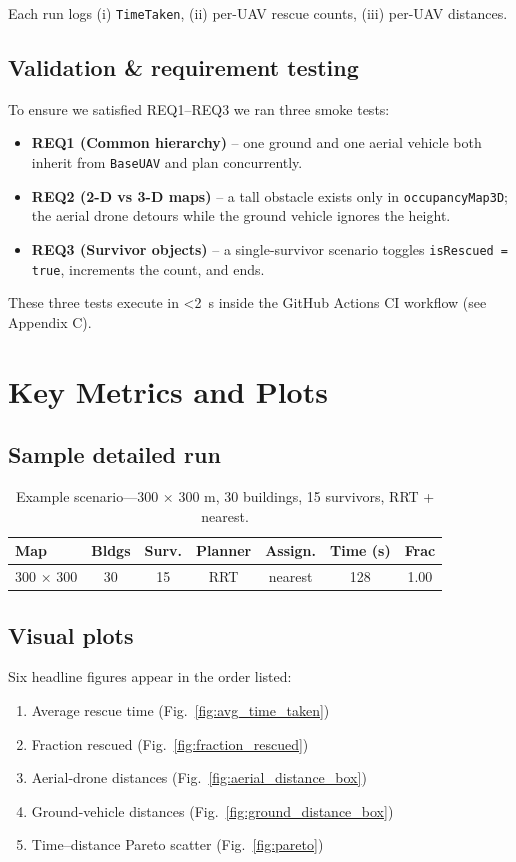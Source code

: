 \documentclass[12pt,a4paper]{report}
\begin{document}
Each run logs  
(i) \texttt{TimeTaken},  
(ii) per-UAV rescue counts,  
(iii) per-UAV distances.

\subsection*{Validation \& requirement testing}
To ensure we satisfied REQ1–REQ3 we ran three smoke tests:
\begin{itemize}
  \item \textbf{REQ1 (Common hierarchy)} – one ground and one aerial
        vehicle both inherit from \texttt{BaseUAV} and plan concurrently.
  \item \textbf{REQ2 (2-D vs 3-D maps)} – a tall obstacle exists only in
        \texttt{occupancyMap3D}; the aerial drone detours while the
        ground vehicle ignores the height.
  \item \textbf{REQ3 (Survivor objects)} – a single-survivor scenario
        toggles \texttt{isRescued = true}, increments the count, and ends.
\end{itemize}
These three tests execute in <\SI{2}{\second} inside the GitHub
Actions CI workflow (see Appendix C).

\section{Key Metrics and Plots}%
\label{sec:quant_results}

\subsection*{Sample detailed run}
\begin{table}[H]
\centering
\caption{Example scenario—300 × 300 m, 30 buildings, 15 survivors, RRT + nearest.}
\label{tab:sampleRuns}
\begin{tabular}{lcccccc}
\toprule
\textbf{Map} & \textbf{Bldgs} & \textbf{Surv.} & \textbf{Planner} &
\textbf{Assign.} & \textbf{Time (s)} & \textbf{Frac}\\
\midrule
300 × 300 & 30 & 15 & RRT & nearest & 128 & 1.00\\
\bottomrule
\end{tabular}
\end{table}

\subsection{Visual plots}
Six headline figures appear in the order listed:
\begin{enumerate}
  \item Average rescue time (Fig.~\ref{fig:avg_time_taken})
  \item Fraction rescued (Fig.~\ref{fig:fraction_rescued})
  \item Aerial-drone distances (Fig.~\ref{fig:aerial_distance_box})
  \item Ground-vehicle distances (Fig.~\ref{fig:ground_distance_box})
  \item Time–distance Pareto scatter (Fig.~\ref{fig:pareto})
\end{enumerate}
\end{document}
